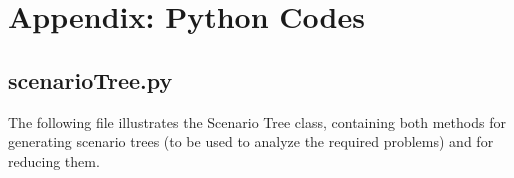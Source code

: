 \documentclass[a4paper,12pt]{article}
\begin{document}

\appendix
\section{Appendix: Python Codes}	



\subsection{scenarioTree.py}
\noindent The following file illustrates the Scenario Tree class, containing both methods for generating scenario trees (to be used to analyze the required problems) and for reducing them.



\end{document}
